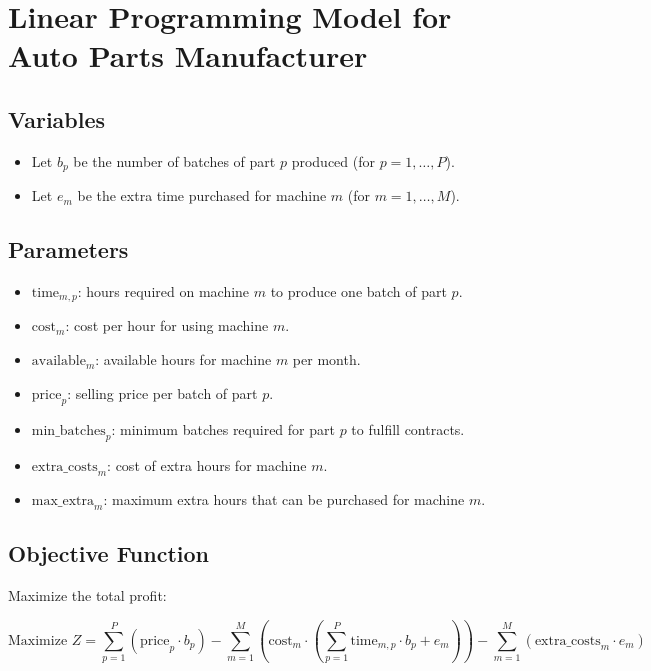 \documentclass{article}
\begin{document}
\section*{Linear Programming Model for Auto Parts Manufacturer}

\subsection*{Variables}
\begin{itemize}
    \item Let \( b_p \) be the number of batches of part \( p \) produced (for \( p = 1, \ldots, P \)).
    \item Let \( e_m \) be the extra time purchased for machine \( m \) (for \( m = 1, \ldots, M \)).
\end{itemize}

\subsection*{Parameters}
\begin{itemize}
    \item \( \text{time}_{m,p} \): hours required on machine \( m \) to produce one batch of part \( p \).
    \item \( \text{cost}_{m} \): cost per hour for using machine \( m \).
    \item \( \text{available}_{m} \): available hours for machine \( m \) per month.
    \item \( \text{price}_{p} \): selling price per batch of part \( p \).
    \item \( \text{min\_batches}_{p} \): minimum batches required for part \( p \) to fulfill contracts.
    \item \( \text{extra\_costs}_{m} \): cost of extra hours for machine \( m \).
    \item \( \text{max\_extra}_{m} \): maximum extra hours that can be purchased for machine \( m \).
\end{itemize}

\subsection*{Objective Function}
Maximize the total profit:

\[
\text{Maximize } Z = \sum_{p=1}^{P} \left( \text{price}_{p} \cdot b_p \right) - \sum_{m=1}^{M} \left( \text{cost}_{m} \cdot \left( \sum_{p=1}^{P} \text{time}_{m,p} \cdot b_p + e_m \right) \right) - \sum_{m=1}^{M} \left( \text{extra\_costs}_{m} \cdot e_m \right)
\]
\end{document}
